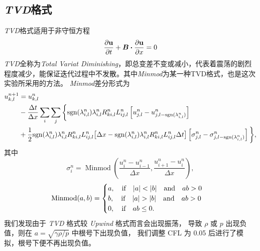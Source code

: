 \documentclass[10.5pt
]{article}
\begin{document}
\subsection{\textit{TVD}格式}
\textit{TVD}格式适用于非守恒方程
\begin{align}
\pdv{\vb u}{t} + \vb*B \vdot \pdv{\vb u}{x} = 0
\end{align}
\textit{TVD}全称为\textit{Total Variat Diminishing}，即总变差不变或减小，代表着震荡的剧烈程度减少，能保证迭代过程中不发散。其中\textit{Minmod}为某一种TVD格式，也是这次实验所采用的方法。
\textit{Minmod}差分形式为
\begin{equation}
\begin{aligned}
u_{k,l}^{n+1} &= u_{k,l}^n \\
& - \frac{\Delta t}{\Delta x} \sum_i \sum_j \bigg\{\text{sgn}(\lambda_{i,l}^n)
 \lambda_{i,l}^n R_{ki,l}^n L_{ij,l}^n \left[u_{j,l}^n - u_{j,l-\text{sgn}(\lambda_{i,l}^n)}^n\right]\\
& + \frac{1}{2}
\text{sgn}(\lambda_{i,l}^n) \lambda_{i,l}^n R_{ki,l}^n L_{ij,l}^n
	\qty[\Delta x-\text{sgn}(\lambda_{i,l}^n) \lambda_{i,l}^n R_{ki,l}^n L_{ij,l}^n \Delta t]
 \left[\sigma_{j,l}^n - \sigma_{j,l-\text{sgn}(\lambda_{i,l}^n)}^n\right]\bigg\},
\end{aligned}
\end{equation}
其中
\begin{equation}
	\sigma_i^n = \operatorname{Minmod} \left( \frac{u_i^n - u_{i-1}^{n}}{ \Delta x }, \frac{u_{i+1}^n - u_{i}^{n}}{ \Delta x } \right),
\end{equation}
\begin{equation}
	\operatorname{Minmod}(a, b) = 
	\begin{cases}
		a, \qif |a| < |b| \qand ab > 0\\
		b, \qif |a| > |b| \qand ab > 0\\
		0, \qif ab \leq 0.
	\end{cases}
\end{equation}
我们发现由于 \textit{TVD} 格式较 \textit{Upwind} 格式而言会出现振荡，
导致 \(\rho\) 或 \(p\) 出现负值，则在 \(a = \sqrt{\gamma \rho / p}\) 中根号下出现负值，
我们调整 CFL 为 0.05 后进行了模拟，根号下便不再出现负值。
\end{document}
